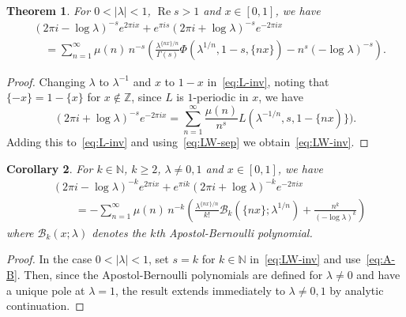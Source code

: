 \documentclass[11pt,a4paper,reqno]{amsart}
\newcommand{\B}{\mathcal{B}}
\newcommand{\N}{\mathbb{N}}
\newcommand{\Z}{\mathbb{Z}}
\renewcommand{\Re}{\operatorname{Re}}
\theoremstyle{plain}
\newtheorem{theorem}{Theorem}%
\newtheorem{cor}[theorem]{Corollary}
\theoremstyle{remark}
\numberwithin{equation}{section}
\begin{document}
\begin{theorem}
\label{th:LW-inv}
For $0 < |\lambda| < 1$, $\Re s > 1$ and $x \in [0,1]$, we have
%
\begin{equation}
\label{eq:LW-inv}
\begin{aligned}
	& (2 \pi i - \log \lambda)^{-s} e^{2 \pi i x}
	  + e^{\pi i s} (2 \pi i + \log \lambda)^{-s} e^{-2 \pi i x}
	\\
	&\quad = \sum_{n=1}^{\infty} \mu(n) \, n^{-s}
	  \left(
	  \frac{\lambda^{\{nx\}/n}}{\Gamma(s)} \Phi(\lambda^{1/n},1-s,\{nx\}) - n^{s} (-\log \lambda)^{-s}
	  \right).
\end{aligned}
\end{equation}
%
\end{theorem}

\begin{proof}
Changing $\lambda$ to $\lambda^{-1}$ and $x$ to $1-x$ in~\eqref{eq:L-inv}, noting that $\{-x\} = 1 - \{x\}$ for $x \notin \Z$, since $L$ is $1$-periodic in $x$, we have
\[
	  (2\pi i + \log\lambda)^{-s} e^{-2\pi i x}
	= \sum_{n=1}^{\infty} \frac{\mu(n)}{n^{s}} L(\lambda^{-1/n},s,1 - \{nx)\}).
\]
Adding this to~\eqref{eq:L-inv} and using~\eqref{eq:LW-sep} we obtain~\eqref{eq:LW-inv}.
\end{proof}

\begin{cor}
\label{cor:AB-inv}
For $k \in \N$, $k \ge 2$, $\lambda \neq 0,1$ and $x \in [0,1]$, we have
%
\begin{equation*}
\begin{aligned}
	& (2 \pi i - \log \lambda)^{-k} e^{2 \pi i x}
	  + e^{\pi i k} (2 \pi i + \log \lambda)^{-k} e^{-2 \pi i x}
	\\
	&\qquad = - \sum_{n=1}^{\infty} \mu(n) \, n^{-k}
	  \left(
	  \frac{\lambda^{\{nx\}/n}}{k!} \B_{k}(\{nx\};\lambda^{1/n}) + \frac{n^{k}}{(-\log \lambda)^{k}}
	  \right)
\end{aligned}
\end{equation*}
%
where $\B_{k}(x;\lambda)$ denotes the $k$th Apostol-Bernoulli polynomial.
\end{cor}

\begin{proof}
In the case $0 < |\lambda| < 1$, set $s = k$ for $k \in \N$ in~\eqref{eq:LW-inv} and use~\eqref{eq:A-B}.
Then, since the Apostol-Bernoulli polynomials are defined for $\lambda \neq 0$ and have a unique pole at $\lambda = 1$, the result extends immediately to $\lambda \neq 0,1$ by analytic continuation.
\end{proof}
\end{document}
